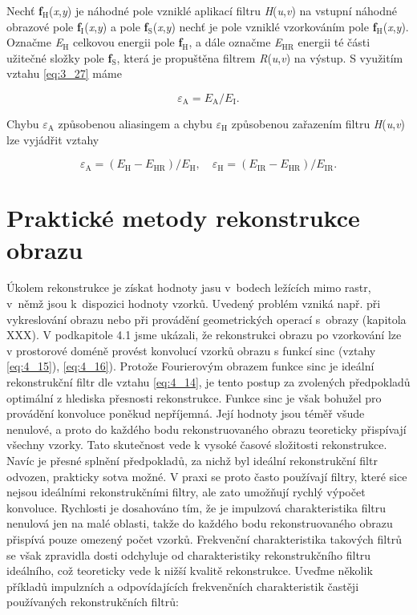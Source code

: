 Nechť \textbf{f}$_\mathrm{H}$(\textit{x},\textit{y}) je náhodné pole vzniklé aplikací filtru \textit{H}(\textit{u},\textit{v}) na vstupní náhodné obrazové pole \textbf{f}$_\mathrm{I}$(\textit{x},\textit{y}) a pole \textbf{f}$_\mathrm{S}$(\textit{x},\textit{y}) nechť je pole vzniklé vzorkováním pole \textbf{f}$_\mathrm{H}$(\textit{x},\textit{y}). Označme \textit{E}$_\mathrm{H}$ celkovou energii pole \textbf{f}$_\mathrm{H}$, a dále označme \textit{E}$_\mathrm{HR}$ energii té části užitečné složky pole \textbf{f}$_\mathrm{S}$, která je propuštěna filtrem \textit{R}(\textit{u},\textit{v}) na výstup. S využitím vztahu \eqref{eq:3_27} máme

\begin{equation} \label{eq:4_30-31}
    \varepsilon_\mathrm{A} = E_\mathrm{A} / E_\mathrm{I}.
\end{equation}

Chybu $\varepsilon_\mathrm{A}$ způsobenou aliasingem a chybu $\varepsilon_{\mathrm{H}}$ způsobenou zařazením filtru \textit{H}(\textit{u},\textit{v}) lze vyjádřit vztahy

\begin{equation} \label{eq:4_32}
    \varepsilon_\mathrm{A} = (E_\mathrm{H} - E_\mathrm{HR}) / E_\mathrm{H}, \quad \varepsilon_\mathrm{H} = (E_\mathrm{IR} - E_\mathrm{HR}) / E_\mathrm{IR}.
\end{equation}

\section*{Praktické metody rekonstrukce obrazu} \label{sec:prakticke_metody_rekonstrukce_obrazu}

Úkolem rekonstrukce je získat hodnoty jasu v~bodech ležících mimo rastr, v~němž jsou k~dispozici hodnoty vzorků. Uvedený problém vzniká např. při vykreslování obrazu nebo při provádění geometrických operací s~obrazy (kapitola XXX). V podkapitole 4.1 jsme ukázali, že rekonstrukci obrazu po vzorkování lze v prostorové doméně provést konvolucí vzorků obrazu s funkcí sinc (vztahy \eqref{eq:4_15}), \eqref{eq:4_16}). Protože Fourierovým obrazem funkce sinc je ideální rekonstrukční filtr dle vztahu \eqref{eq:4_14}, je tento postup za zvolených předpokladů optimální z hlediska přesnosti rekonstrukce. Funkce sinc je však bohužel pro provádění konvoluce poněkud nepříjemná. Její hodnoty jsou téměř všude nenulové, a proto do každého bodu rekonstruovaného obrazu teoreticky přispívají všechny vzorky. Tato skutečnost vede k vysoké časové složitosti rekonstrukce. Navíc je přesné splnění předpokladů, za nichž byl ideální rekonstrukční filtr odvozen, prakticky sotva možné. V praxi se proto často používají filtry, které sice nejsou ideálními rekonstrukčními filtry, ale zato umožňují rychlý výpočet konvoluce. Rychlosti je dosahováno tím, že je impulzová charakteristika filtru nenulová jen na malé oblasti, takže do každého bodu rekonstruovaného obrazu přispívá pouze omezený počet vzorků. Frekvenční charakteristika takových filtrů se však zpravidla dosti odchyluje od charakteristiky rekonstrukčního filtru ideálního, což teoreticky vede k nižší kvalitě rekonstrukce. Uveďme několik příkladů impulzních a odpovídajících frekvenčních charakteristik častěji používaných rekonstrukčních filtrů:

